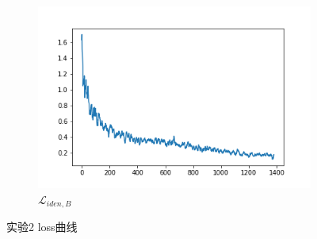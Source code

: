\documentclass{beamer}
\begin{document}
\begin{frame}
\begin{figure}[htb]
\begin{subfigure}[b]{0.23\linewidth}
            \includegraphics[width=\linewidth]{exp2_idt_B.png}
            \caption{$\mathcal{L}_{iden,B}$}
          \end{subfigure}
          \caption{实验2 loss曲线}
          \label{fig:exp2loss}
    \end{figure}
\end{frame}
\end{document}
